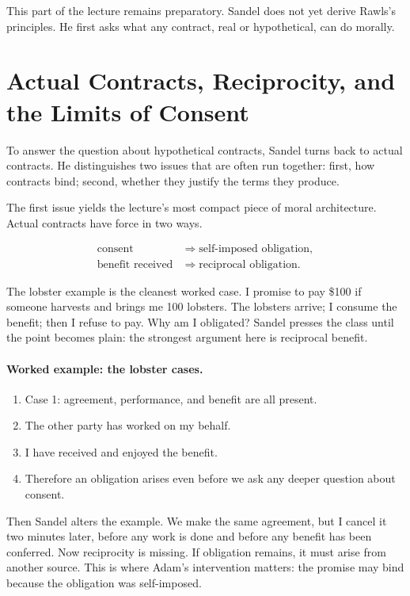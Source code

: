This part of the lecture remains preparatory. Sandel does not yet derive Rawls's principles. He first asks what any contract, real or hypothetical, can do morally.

\section{Actual Contracts, Reciprocity, and the Limits of Consent}

To answer the question about hypothetical contracts, Sandel turns back to actual contracts. He distinguishes two issues that are often run together: first, how contracts bind; second, whether they justify the terms they produce.

The first issue yields the lecture's most compact piece of moral architecture. Actual contracts have force in two ways.

\begin{align}
\text{consent} &\Longrightarrow \text{self-imposed obligation}, \\
\text{benefit received} &\Longrightarrow \text{reciprocal obligation}.
\end{align}

The lobster example is the cleanest worked case. I promise to pay \$100 if someone harvests and brings me 100 lobsters. The lobsters arrive; I consume the benefit; then I refuse to pay. Why am I obligated? Sandel presses the class until the point becomes plain: the strongest argument here is reciprocal benefit.

\paragraph{Worked example: the lobster cases.}

\begin{enumerate}
\item Case 1: agreement, performance, and benefit are all present.
\item The other party has worked on my behalf.
\item I have received and enjoyed the benefit.
\item Therefore an obligation arises even before we ask any deeper question about consent.
\end{enumerate}

Then Sandel alters the example. We make the same agreement, but I cancel it two minutes later, before any work is done and before any benefit has been conferred. Now reciprocity is missing. If obligation remains, it must arise from another source. This is where Adam's intervention matters: the promise may bind because the obligation was self-imposed.

